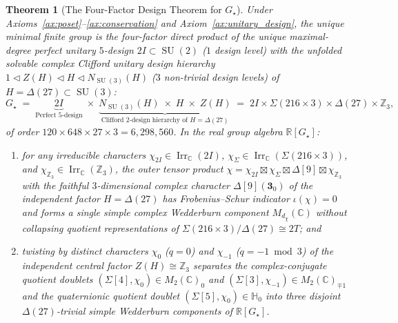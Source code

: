 \documentclass[11pt,a4paper]{article}
\newtheorem{theorem}{Theorem}[section]
\theoremstyle{definition}
\theoremstyle{remark}
\newcommand{\R}{\mathbb{R}}
\newcommand{\C}{\mathbb{C}}
\newcommand{\quat}{\mathbb{H}}
\newcommand{\Z}{\mathbb{Z}}
\newcommand{\Irr}{\operatorname{Irr}}
\newcommand{\SU}{\operatorname{SU}}
\newcommand{\Gstar}{G_\star}
\begin{document}
\begin{theorem}[The Four-Factor Design Theorem for $\Gstar$]
\label{thm:design}
Under Axioms~\ref{ax:poset}--\ref{ax:conservation} and Axiom~\ref{ax:unitary_design}, the unique minimal finite group is the four-factor direct product of the unique maximal-degree perfect unitary $5$-design $2I \subset \SU(2)$ ($1$ design level) with the unfolded solvable complex Clifford unitary design hierarchy $1 \triangleleft Z(H) \triangleleft H \triangleleft N_{\SU(3)}(H)$ ($3$ non-trivial design levels) of $H = \Delta(27) \subset \SU(3)$:
\begin{equation}
\label{eq:clifford_tower}
\Gstar \;=\; \underbrace{2I}_{\text{Perfect }5\text{-design}} \;\times\; \underbrace{N_{\SU(3)}(H) \;\times\; H \;\times\; Z(H)}_{\text{Clifford }2\text{-design hierarchy of }H = \Delta(27)} \;=\; 2I \times \Sigma(216 \times 3) \times \Delta(27) \times \Z_3,
\end{equation}
of order $120 \times 648 \times 27 \times 3 = 6{,}298{,}560$. In the real group algebra $\R[\Gstar]$:
\begin{enumerate}
    \item for any irreducible characters $\chi_{2I} \in \Irr_{\C}(2I)$, $\chi_\Sigma \in \Irr_{\C}(\Sigma(216 \times 3))$, and $\chi_{\Z_3} \in \Irr_{\C}(\Z_3)$, the outer tensor product $\chi = \chi_{2I} \boxtimes \chi_\Sigma \boxtimes \Delta[9] \boxtimes \chi_{\Z_3}$ with the faithful $3$-dimensional complex character $\Delta[9](\mathbf{3}_0)$ of the independent factor $H = \Delta(27)$ has Frobenius--Schur indicator $\iota(\chi) = 0$ and forms a single simple complex Wedderburn component $M_{d_\chi}(\C)$ without collapsing quotient representations of $\Sigma(216 \times 3)/\Delta(27) \cong 2T$; and
    \item twisting by distinct characters $\chi_0$ ($q = 0$) and $\chi_{-1}$ ($q = -1 \bmod 3$) of the independent central factor $Z(H) \cong \Z_3$ separates the complex-conjugate quotient doublets $(\Sigma[4], \chi_0) \in M_2(\C)_0$ and $(\Sigma[3], \chi_{-1}) \in M_2(\C)_{\mp 1}$ and the quaternionic quotient doublet $(\Sigma[5], \chi_0) \in \quat_0$ into three disjoint $\Delta(27)$-trivial simple Wedderburn components of $\R[\Gstar]$.
\end{enumerate}
\end{theorem}
\end{document}
